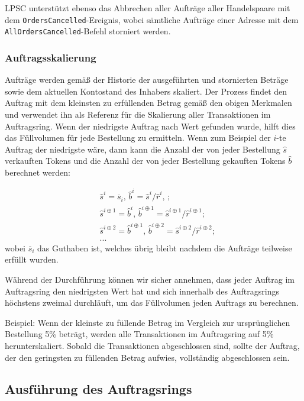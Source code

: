 \documentclass[UTF8,nofonts]{article}
\begin{document}
\begin{multicols}{2}
LPSC unterstützt ebenso das Abbrechen aller Aufträge aller Handelspaare mit dem \verb|OrdersCancelled|-Ereignis, wobei sämtliche Aufträge einer Adresse mit dem \verb|AllOrdersCancelled|-Befehl storniert werden.

\subsubsection{Auftragsskalierung\label{sec:order_scaling}}
Aufträge werden gemäß der Historie der ausgeführten und stornierten Beträge sowie dem aktuellen Kontostand des Inhabers skaliert. Der Prozess findet den Auftrag mit dem kleinsten zu erfüllenden Betrag gemäß den obigen Merkmalen und verwendet ihn als Referenz für die Skalierung aller Transaktionen im Auftragsring.
Wenn der niedrigste Auftrag nach Wert gefunden wurde, hilft dies das Füllvolumen für jede Bestellung zu ermitteln. Wenn zum Beispiel der $i$-te Auftrag der niedrigste wäre,  dann kann die Anzahl der von jeder Bestellung $\hat{s}$ verkauften Tokens und die Anzahl der von jeder Bestellung gekauften Tokens $\hat{b}$ berechnet werden:

\[
\begin{split}
&\hat{s}^{i}=\overline{s}_i\text{, } \hat{b}^{i}=\hat{s}^{i}/ \hat{r}^i\text{, }\text{;}\\
&\hat{s}^{i\oplus 1}=\hat{b}^i\text{, } \hat{b}^{i\oplus 1}=\hat{s}^{i\oplus 1}/ \hat{r}^{i\oplus 1}\text{;}\\
&\hat{s}^{i\oplus 2}=\hat{b}^{i\oplus 1}\text{, } \hat{b}^{i\oplus 2}=\hat{s}^{i\oplus 2}/ \hat{r}^{i\oplus 2}\text{;}\\
& ...
\end{split}
\]
wobei $\overline{s}_i$ das Guthaben ist, welches übrig bleibt nachdem die Aufträge teilweise erfüllt wurden.

Während der Durchführung können wir sicher annehmen, dass jeder Auftrag im Auftragsring den niedrigsten Wert hat und sich innerhalb des Auftragsrings höchstens zweimal durchläuft, um das Füllvolumen jeden Auftrags zu berechnen.

Beispiel: Wenn der kleinste zu füllende Betrag im Vergleich zur ursprünglichen Bestellung 5\% beträgt, werden alle Transaktionen im Auftragsring auf 5\% herunterskaliert. Sobald die Transaktionen abgeschlossen sind, sollte der Auftrag, der den geringsten zu füllenden Betrag aufwies, vollständig abgeschlossen sein.

\subsection{Ausführung des Auftragsrings\label{sec:settlement}}


\end{multicols}
\end{document}
